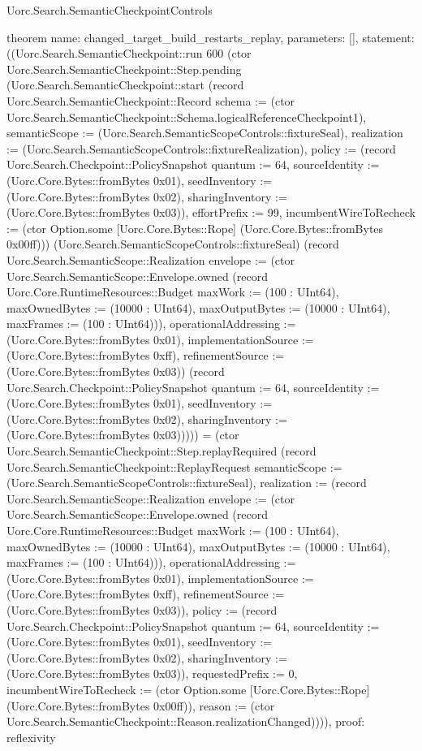 \begin{lexlean}{Uorc.Search.SemanticCheckpointControls}
\begin{semanticmodule}
theorem{
  name: changed_target_build_restarts_replay,
  parameters: [],
  statement: ((Uorc.Search.SemanticCheckpoint::run 600 (ctor Uorc.Search.SemanticCheckpoint::Step.pending (Uorc.Search.SemanticCheckpoint::start (record Uorc.Search.SemanticCheckpoint::Record {schema := (ctor Uorc.Search.SemanticCheckpoint::Schema.logicalReferenceCheckpoint1), semanticScope := (Uorc.Search.SemanticScopeControls::fixtureSeal), realization := (Uorc.Search.SemanticScopeControls::fixtureRealization), policy := (record Uorc.Search.Checkpoint::PolicySnapshot {quantum := 64, sourceIdentity := (Uorc.Core.Bytes::fromBytes 0x01), seedInventory := (Uorc.Core.Bytes::fromBytes 0x02), sharingInventory := (Uorc.Core.Bytes::fromBytes 0x03)}), effortPrefix := 99, incumbentWireToRecheck := (ctor Option.some [Uorc.Core.Bytes::Rope] (Uorc.Core.Bytes::fromBytes 0x00ff))}) (Uorc.Search.SemanticScopeControls::fixtureSeal) (record Uorc.Search.SemanticScope::Realization {envelope := (ctor Uorc.Search.SemanticScope::Envelope.owned (record Uorc.Core.RuntimeResources::Budget {maxWork := (100 : UInt64), maxOwnedBytes := (10000 : UInt64), maxOutputBytes := (10000 : UInt64), maxFrames := (100 : UInt64)})), operationalAddressing := (Uorc.Core.Bytes::fromBytes 0x01), implementationSource := (Uorc.Core.Bytes::fromBytes 0xff), refinementSource := (Uorc.Core.Bytes::fromBytes 0x03)}) (record Uorc.Search.Checkpoint::PolicySnapshot {quantum := 64, sourceIdentity := (Uorc.Core.Bytes::fromBytes 0x01), seedInventory := (Uorc.Core.Bytes::fromBytes 0x02), sharingInventory := (Uorc.Core.Bytes::fromBytes 0x03)})))) = (ctor Uorc.Search.SemanticCheckpoint::Step.replayRequired (record Uorc.Search.SemanticCheckpoint::ReplayRequest {semanticScope := (Uorc.Search.SemanticScopeControls::fixtureSeal), realization := (record Uorc.Search.SemanticScope::Realization {envelope := (ctor Uorc.Search.SemanticScope::Envelope.owned (record Uorc.Core.RuntimeResources::Budget {maxWork := (100 : UInt64), maxOwnedBytes := (10000 : UInt64), maxOutputBytes := (10000 : UInt64), maxFrames := (100 : UInt64)})), operationalAddressing := (Uorc.Core.Bytes::fromBytes 0x01), implementationSource := (Uorc.Core.Bytes::fromBytes 0xff), refinementSource := (Uorc.Core.Bytes::fromBytes 0x03)}), policy := (record Uorc.Search.Checkpoint::PolicySnapshot {quantum := 64, sourceIdentity := (Uorc.Core.Bytes::fromBytes 0x01), seedInventory := (Uorc.Core.Bytes::fromBytes 0x02), sharingInventory := (Uorc.Core.Bytes::fromBytes 0x03)}), requestedPrefix := 0, incumbentWireToRecheck := (ctor Option.some [Uorc.Core.Bytes::Rope] (Uorc.Core.Bytes::fromBytes 0x00ff)), reason := (ctor Uorc.Search.SemanticCheckpoint::Reason.realizationChanged)}))),
  proof: reflexivity{}
}


\end{semanticmodule}
\end{lexlean}
